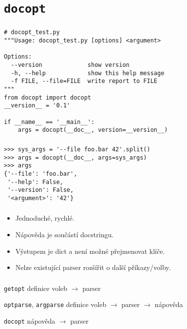 \section{\texttt{docopt}}
\begin{frame}[fragile]
\frametitle{\insertsection}

\begin{verbatim}
# docopt_test.py
"""Usage: docopt_test.py [options] <argument>

Options:
  --version             show version
  -h, --help            show this help message
  -f FILE, --file=FILE  write report to FILE
"""
from docopt import docopt
__version__ = '0.1'

if __name__ == '__main__':
    args = docopt(__doc__, version=__version__)
\end{verbatim}

\end{frame}

\begin{frame}[fragile]
\frametitle{\insertsection}

\begin{verbatim}
>>> sys_args = '--file foo.bar 42'.split()
>>> args = docopt(__doc__, args=sys_args)
>>> args
{'--file': 'foo.bar',
 '--help': False,
 '--version': False,
 '<argument>': '42'}
\end{verbatim}

\end{frame}

\begin{frame}
\frametitle{\insertsection}

\pause

\begin{itemize}[<+->]
\item Jednoduché, rychlé.
\item Nápověda je součástí docstringu.
\end{itemize}

\begin{itemize}[<+->]
\item Výstupem je dict a není možné přejmenovat klíče.
\item Nelze existující parser rozšířit o další příkazy/volby.
\end{itemize}
\end{frame}

\begin{frame}[fragile]
\frametitle{\insertsection}

\begin{beamerboxesrounded}{\texttt{getopt}}
definice voleb $\rightarrow$ parser
\end{beamerboxesrounded}

\medskip
\pause
\begin{beamerboxesrounded}{\texttt{optparse}, \texttt{argparse}}
definice voleb $\rightarrow$ parser $\rightarrow$ nápověda
\end{beamerboxesrounded}

\medskip
\pause
\begin{beamerboxesrounded}{\texttt{docopt}}
nápověda $\rightarrow$ parser
\end{beamerboxesrounded}
\end{frame}
